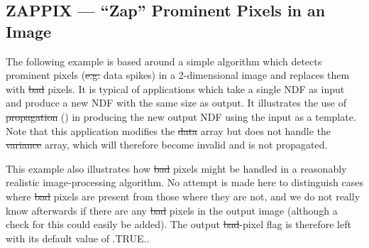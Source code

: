\newpage
\subsection{ZAPPIX --- ``Zap'' Prominent Pixels in an Image}

The following example is based around a simple algorithm which detects prominent
pixels (\st{e.g.\/} data spikes) in a 2-dimensional image and replaces them with
\st{bad\/} pixels. It is typical of applications which take a single NDF as
input and produce a new NDF with the same size as output. It illustrates the use
of \st{propagation\/} () in producing the new output NDF using the input
as a template. Note that this application modifies the \st{data\/} array but
does not handle the \st{variance \/} array, which will therefore become invalid
and is not propagated.

This example also illustrates how \st{bad\/} pixels might be handled in a
reasonably realistic image-processing algorithm. No attempt is made here to
distinguish cases where \st{bad\/} pixels are present from those where they are
not, and we do not really know afterwards if there are any \st{bad\/} pixels in
the output image (although a check for this could easily be added). The output
\st{bad\/}-pixel flag is therefore left with its default value of
.TRUE..

